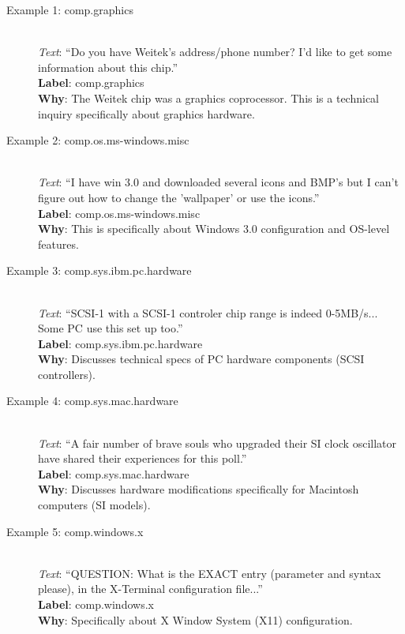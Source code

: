 \documentclass{article}
\begin{document}
\begin{description}
    \item[Example 1: comp.graphics] \hfill \\
    \textit{Text}: ``Do you have Weitek's address/phone number? I'd like to get some information about this chip.'' \\
    \textbf{Label}: comp.graphics \\
    \textbf{Why}: The Weitek chip was a graphics coprocessor. This is a technical inquiry specifically about graphics hardware.

    \item[Example 2: comp.os.ms-windows.misc] \hfill \\
    \textit{Text}: ``I have win 3.0 and downloaded several icons and BMP's but I can't figure out how to change the 'wallpaper' or use the icons.'' \\
    \textbf{Label}: comp.os.ms-windows.misc \\
    \textbf{Why}: This is specifically about Windows 3.0 configuration and OS-level features.

    \item[Example 3: comp.sys.ibm.pc.hardware] \hfill \\
    \textit{Text}: ``SCSI-1 {with a SCSI-1 controler chip} range is indeed 0-5MB/s... Some PC use this set up too.'' \\
    \textbf{Label}: comp.sys.ibm.pc.hardware \\
    \textbf{Why}: Discusses technical specs of PC hardware components (SCSI controllers).

    \item[Example 4: comp.sys.mac.hardware] \hfill \\
    \textit{Text}: ``A fair number of brave souls who upgraded their SI clock oscillator have shared their experiences for this poll.'' \\
    \textbf{Label}: comp.sys.mac.hardware \\
    \textbf{Why}: Discusses hardware modifications specifically for Macintosh computers (SI models).

    \item[Example 5: comp.windows.x] \hfill \\
    \textit{Text}: ``QUESTION: What is the EXACT entry (parameter and syntax please), in the X-Terminal configuration file...'' \\
    \textbf{Label}: comp.windows.x \\
    \textbf{Why}: Specifically about X Window System (X11) configuration.


\end{description}
\end{document}
